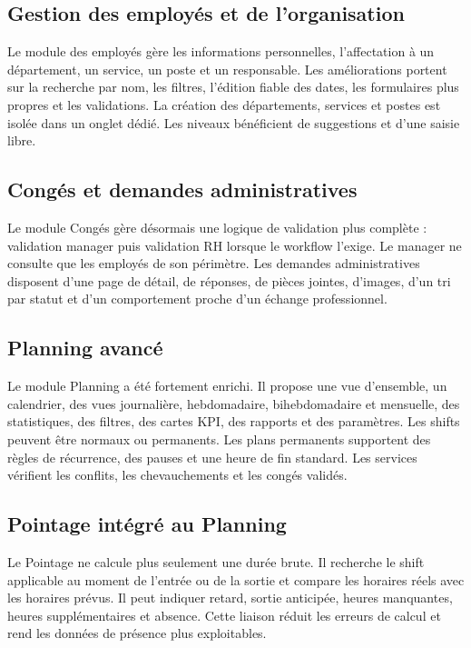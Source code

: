 \documentclass[12pt,a4paper]{report}
\begin{document}
\subsection{Gestion des employés et de l'organisation}
Le module des employés gère les informations personnelles, l'affectation à un département, un service, un poste et un responsable. Les améliorations portent sur la recherche par nom, les filtres, l'édition fiable des dates, les formulaires plus propres et les validations. La création des départements, services et postes est isolée dans un onglet dédié. Les niveaux bénéficient de suggestions et d'une saisie libre.

\subsection{Congés et demandes administratives}
Le module Congés gère désormais une logique de validation plus complète : validation manager puis validation RH lorsque le workflow l'exige. Le manager ne consulte que les employés de son périmètre. Les demandes administratives disposent d'une page de détail, de réponses, de pièces jointes, d'images, d'un tri par statut et d'un comportement proche d'un échange professionnel.

\subsection{Planning avancé}
Le module Planning a été fortement enrichi. Il propose une vue d'ensemble, un calendrier, des vues journalière, hebdomadaire, bihebdomadaire et mensuelle, des statistiques, des filtres, des cartes KPI, des rapports et des paramètres. Les shifts peuvent être normaux ou permanents. Les plans permanents supportent des règles de récurrence, des pauses et une heure de fin standard. Les services vérifient les conflits, les chevauchements et les congés validés.

\subsection{Pointage intégré au Planning}
Le Pointage ne calcule plus seulement une durée brute. Il recherche le shift applicable au moment de l'entrée ou de la sortie et compare les horaires réels avec les horaires prévus. Il peut indiquer retard, sortie anticipée, heures manquantes, heures supplémentaires et absence. Cette liaison réduit les erreurs de calcul et rend les données de présence plus exploitables.
\end{document}
